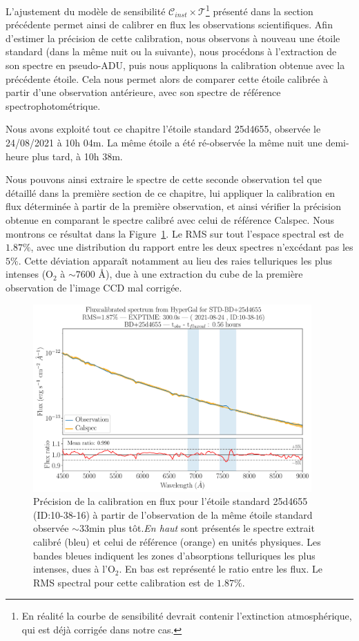 \documentclass[../main/main.tex]{subfiles}
\begin{document}
L'ajustement du modèle de sensibilité $\mathcal{C}_{inst}\times\mathcal{T}$\footnote{En réalité la
  courbe de sensibilité devrait contenir l'extinction atmosphérique, qui
est déjà corrigée dans notre cas.} présenté dans la section
précédente permet ainsi de calibrer en flux les observations
scientifiques. Afin d'estimer la précision de cette calibration, nous
observons à nouveau une étoile standard (dans la même nuit ou la
suivante), nous procédons à l'extraction de son spectre en pseudo-ADU,
puis nous appliquons la calibration obtenue avec la précédente étoile.
Cela nous permet alors de comparer cette étoile calibrée à partir d'une
observation antérieure, avec son spectre de référence
spectrophotométrique.

Nous avons exploité tout ce chapitre l'étoile standard 25d4655, observée
le 24/08/2021 à 10h 04m. La même étoile a été ré-observée la même
nuit une demi-heure plus tard, à 10h 38m.

Nous pouvons ainsi extraire le spectre de cette seconde
observation tel que détaillé dans la première section de ce chapitre,
lui appliquer la calibration en flux déterminée à partir de la première
observation, et ainsi vérifier la précision obtenue en comparant le
spectre calibré avec celui de référence Calspec.
Nous montrons ce résultat dans la Figure~\ref{fig:fluxcalstd}.
Le RMS sur tout l'espace spectral est de $1.87\%$, avec une distribution
du rapport entre les deux spectres n'excédant pas les $5\%$. Cette
déviation apparaît notamment au lieu des raies telluriques les
plus intenses (O$_{2}$ à $\sim7600$ \AA), due à une extraction du cube de
la première observation de l'image CCD mal corrigée.
\begin{figure}[ht]
  \centering
  \includegraphics[width=0.95\textwidth]{../figures/06_irf/fluxcalstd.pdf}
  \caption[Précision de la calibration en flux pour une étoile
  standard.]{Précision de la calibration en flux pour l'étoile standard
    25d4655 (ID:10-38-16) à partir de l'observation de la même étoile standard
    observée $\sim33$min plus tôt.\emph{En haut} sont présentés le
    spectre extrait calibré (bleu) et celui de référence (orange) en
    unités physiques. Les bandes bleues indiquent les zones
    d'absorptions telluriques les plus intenses, dues à l'O$_{2}$. En
    bas est représenté le ratio entre les flux. Le RMS spectral pour
    cette calibration est de $1.87\%$.}
  \label{fig:fluxcalstd}
\end{figure}
\end{document}
